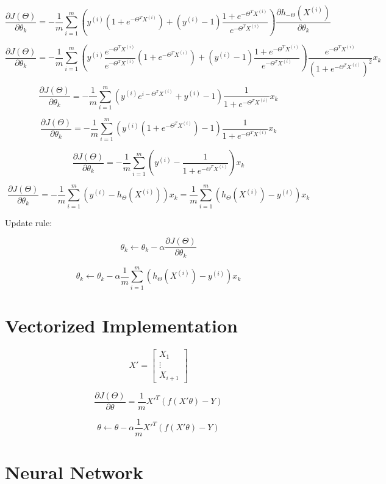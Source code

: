 \documentclass[a4, article]{article}
\begin{document}
\[ \frac{\partial J(\Theta)}{\partial \theta_k} = - \frac{1}{m} \sum_{i=1}^{m}(y^{(i)}(1+e^{-\Theta^T X^{(i)}}) + (y^{(i)} - 1)\frac{1+e^{-\Theta^T X^{(i)}}}{e^{-\Theta^T X^{(i)}}}) \frac{\partial h_{-\Theta}(X^{(i)})}{\partial \theta_k}\]

\[ \frac{\partial J(\Theta)}{\partial \theta_k} = - \frac{1}{m} \sum_{i=1}^{m}(y^{(i)}\frac{e^{-\Theta^T X^{(i)}}}{e^{-\Theta^T X^{(i)}}}(1+e^{-\Theta^T X^{(i)}}) + (y^{(i)} - 1)\frac{1+e^{-\Theta^T X^{(i)}}}{e^{-\Theta^T X^{(i)}}}) \frac{e^{-\Theta^T X^{(i)}}}{(1 + e^{-\Theta^T X^{(i)}})^2} x_k\]

\[ \frac{\partial J(\Theta)}{\partial \theta_k} = - \frac{1}{m} \sum_{i=1}^{m}(y^{(i)} e^{i-\Theta^T X^{(i)}} + y^{(i)} - 1) \frac{1}{1 + e^{-\Theta^T X^{(i)}}} x_k \]

\[ \frac{\partial J(\Theta)}{\partial \theta_k} = -\frac{1}{m} \sum_{i=1}^{m}(y^{(i)}(1 + e^{-\Theta^T X^{(i)}}) - 1) \frac{1}{1 + e^{-\Theta^T X^{(i)}}} x_k \]

\[ \frac{\partial J(\Theta)}{\partial \theta_k} = -\frac{1}{m} \sum_{i=1}^{m}(y^{(i)} - \frac{1}{1 + e^{-\Theta^T X^{(i)}}}) x_k \]

\[ \frac{\partial J(\Theta)}{\partial \theta_k} = -\frac{1}{m} \sum_{i=1}^{m}(y^{(i)} - h_{\Theta}(X^{(i)})) x_k = \frac{1}{m} \sum_{i=1}^{m} (h_{\Theta}(X^{(i)}) - y^{(i)}) x_k \]

Update rule:

\[ \theta_k \leftarrow \theta_k - \alpha \frac{\partial J(\Theta)}{\partial \theta_k} \]

\[ \theta_k \leftarrow \theta_k - \alpha \frac{1}{m} \sum_{i=1}^{m} (h_{\Theta}(X^{(i)}) - y^{(i)}) x_k \]

\section{Vectorized Implementation}

\[ X' = \left[
\begin{array}{c}
X_1 \\
\vdots \\
X_{i+1}
\end{array}
\right] \]

\[ \frac{\partial J(\Theta)}{\partial \theta} = \frac{1}{m} X'^T (f(X' \theta) - Y) \]

\[ \theta \leftarrow \theta - \alpha \frac{1}{m} X'^T (f(X' \theta) - Y)  \]

\section{Neural Network}
\end{document}
